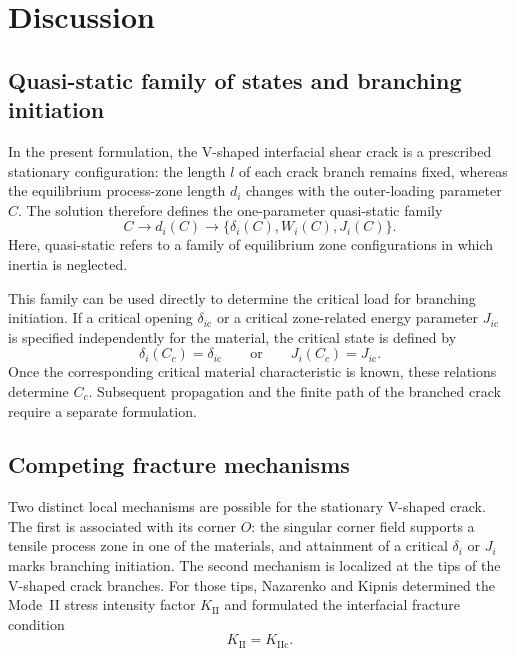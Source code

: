 \section{Discussion}
\label{sec:discussion}

\subsection{Quasi-static family of states and branching initiation}
\label{subsec:discussion-quasistatic}

In the present formulation, the V-shaped interfacial shear crack is a
prescribed stationary configuration: the length $l$ of each crack branch
remains fixed, whereas the equilibrium process-zone length $d_i$ changes
with the outer-loading parameter $C$. The solution therefore defines the
one-parameter quasi-static family
\begin{equation*}
  C\longrightarrow d_i(C)
  \longrightarrow
  \bigl\{\delta_i(C),W_i(C),J_i(C)\bigr\}.
\end{equation*}
Here, quasi-static refers to a family of equilibrium zone configurations
in which inertia is neglected.

This family can be used directly to determine the critical load for
branching initiation. If a critical opening $\delta_{i\mathrm{c}}$ or a
critical zone-related energy parameter $J_{i\mathrm{c}}$ is specified
independently for the material, the critical state is defined by
\begin{equation*}
  \delta_i(C_c)=\delta_{i\mathrm{c}}
  \qquad\text{or}\qquad
  J_i(C_c)=J_{i\mathrm{c}}.
\end{equation*}
Once the corresponding critical material characteristic is known, these
relations determine $C_c$. Subsequent propagation and the finite path of
the branched crack require a separate formulation.

\subsection{Competing fracture mechanisms}
\label{subsec:discussion-competing}

Two distinct local mechanisms are possible for the stationary V-shaped
crack. The first is associated with its corner $O$: the singular corner
field supports a tensile process zone in one of the materials, and
attainment of a critical $\delta_i$ or $J_i$ marks branching initiation.
The second mechanism is localized at the tips of the V-shaped crack branches. For those tips, Nazarenko and Kipnis
\cite{NazarenkoKipnis2022Equilibrium} determined the Mode~II stress
intensity factor $K_{\mathrm{II}}$ and formulated the interfacial
fracture condition
\begin{equation*}
  K_{\mathrm{II}}=K_{\mathrm{IIc}}.
\end{equation*}


